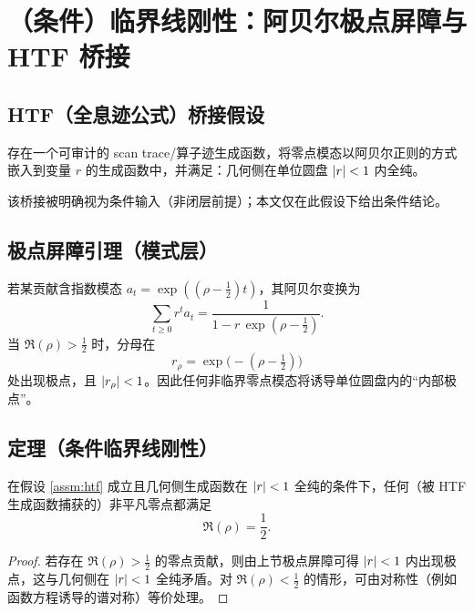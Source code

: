 \section{（条件）临界线刚性：阿贝尔极点屏障与 HTF 桥接}\label{sec:critical}

\subsection{HTF（全息迹公式）桥接假设}
\begin{assumption}\label{assm:htf}
存在一个可审计的 scan trace/算子迹生成函数，将零点模态以阿贝尔正则的方式嵌入到变量 $r$ 的生成函数中，并满足：几何侧在单位圆盘 $\left\lvert r\right\rvert<1$ 内全纯。
\end{assumption}
该桥接被明确视为条件输入（非闭层前提）；本文仅在此假设下给出条件结论。

\subsection{极点屏障引理（模式层）}
若某贡献含指数模态 $a_t=\exp((\rho-\tfrac12)t)$，其阿贝尔变换为
\[
  \sum_{t\ge 0} r^t a_t=\frac{1}{1-r\,\exp(\rho-\tfrac12)}.
\]
当 $\Re(\rho)>\tfrac12$ 时，分母在
\[
  r_\rho=\exp\!\bigl(-(\rho-\tfrac12)\bigr)
\]
处出现极点，且 $\left\lvert r_\rho\right\rvert<1$。因此任何非临界零点模态将诱导单位圆盘内的“内部极点”。

\subsection{定理（条件临界线刚性）}
\begin{theorem}\label{thm:conditional-rh}
在假设 \ref{assm:htf} 成立且几何侧生成函数在 $\left\lvert r\right\rvert<1$ 全纯的条件下，任何（被 HTF 生成函数捕获的）非平凡零点都满足
\[
  \Re(\rho)=\frac12.
\]
\end{theorem}
\begin{proof}
若存在 $\Re(\rho)>\tfrac12$ 的零点贡献，则由上节极点屏障可得 $\left\lvert r\right\rvert<1$ 内出现极点，这与几何侧在 $\left\lvert r\right\rvert<1$ 全纯矛盾。对 $\Re(\rho)<\tfrac12$ 的情形，可由对称性（例如函数方程诱导的谱对称）等价处理。
\end{proof}

